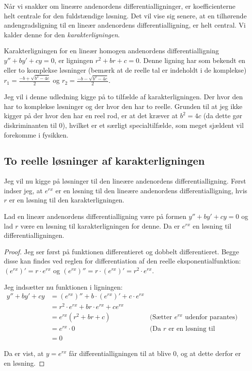 Når vi snakker om lineære andenordens differentialligninger, er koefficienterne helt centrale for den fuldstændige løsning. 
Det vil vise sig senere, at en tilhørende andengradsligning til en lineær andenordens differentialligning, er helt central. Vi kalder denne for den \textit{karakterligningen}.

\begin{definition}[Karakterligningen]
Karakterligningen for en lineær homogen andenordens differentialligning $y'' + by' + cy = 0$, er ligningen $r^2 + br + c = 0$. 
Denne ligning har som bekendt en eller to komplekse løsninger (bemærk at de reelle tal er indeholdt i de komplekse) $r_1 = \frac{-b + \sqrt{b^2 - 4c}}{2}$ og $r_2 = \frac{-b - \sqrt{b^2 - 4c}}{2}$.
\end{definition}

Jeg vil i denne udledning kigge på to tilfælde af karakterligningen. 
Der hvor den har to komplekse løsninger og der hvor den har to reelle.
Grunden til at jeg ikke kigger på der hvor den har en reel rod, er at det kræver at $b^2 = 4c$ (da dette gør diskriminanten til $0$), hvilket er et særligt specialtilfælde, som meget sjældent vil forekomme i fysikken.

\subsection{To reelle løsninger af karakterligningen}
Jeg vil nu kigge på løsninger til den lineære andenordens differentialligning. 
Først indser jeg, at $e^{rx}$ er en løsning til den lineære andenordens differentialligning, hvis $r$ er en løsning til den karakterligningen.

\begin{thm}\label{thm: e^rx er en losning}
Lad en lineær andenordens differentialligning være på formen $y'' + by' + cy = 0$ og lad $r$ være en løsning til karakterligningen for denne.
Da er $e^{rx}$ en løsning til differentialligningen. 
\end{thm}

\begin{proof}
Jeg ser først på funktionen differentieret og dobbelt differentieret. 
Begge disse kan findes ved reglen for differentiation af den reelle eksponentialfunktion: 
$(e^{rx})' = r \cdot e^{rx}$ og 
$(e^{rx})'' = r\cdot (e^{rx})' = r^2 \cdot e^{rx}$.

Jeg indsætter nu funktionen i ligningen:
\begin{align*}
y'' + by' + cy 	&= (e^{rx})'' + b\cdot (e^{rx})' + c\cdot e^{rx} \\
				&= r^2 \cdot e^{rx} + br\cdot e^{rx} + c e^{rx} \\
				&= e^{rx} (r^2 + br + c)  & \text{(Sætter $e^{rx}$ udenfor parantes)}\\
				&= e^{rx} \cdot 0 		& \text{(Da $r$ er en løsning til karakterligningen)}\\
				&=0
\end{align*}

Da er vist, at $y=e^{rx}$ får differentialligningen til at blive $0$, og at dette derfor er en løsning. 
\end{proof}

